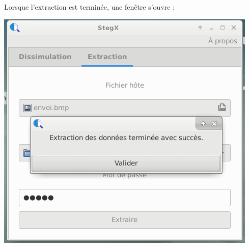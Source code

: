 \documentclass[11pt]{article}
\begin{document}
Lorsque l'extraction est terminée, une fenêtre s'ouvre : 

\vspace{0.5cm}
\hspace{2.5cm}
\includegraphics[scale=0.8]{pictures/extraction_3.png}
\vspace{1cm}
\end{document}
